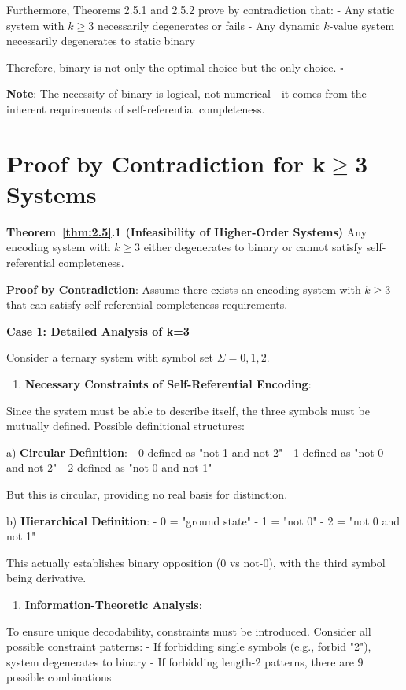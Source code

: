    Furthermore, Theorems 2.5.1 and 2.5.2 prove by contradiction that:
   - Any static system with $k \geq 3$ necessarily degenerates or fails
   - Any dynamic $k$-value system necessarily degenerates to static binary
   
Therefore, binary is not only the optimal choice but the only choice. $\square$

\textbf{Note}: The necessity of binary is logical, not numerical---it comes from the inherent requirements of self-referential completeness.

\section{Proof by Contradiction for k$\geq$3 Systems}
\label{sec:ch04_encoding:proof-by-contradiction-for-k-geq-3-systems}

\textbf{Theorem~\ref{thm:2.5}.1 (Infeasibility of Higher-Order Systems)}
\label{thm:2.5}
Any encoding system with $k \geq 3$ either degenerates to binary or cannot satisfy self-referential completeness.

\textbf{Proof by Contradiction}:
Assume there exists an encoding system with $k \geq 3$ that can satisfy self-referential completeness requirements.

\textbf{Case 1: Detailed Analysis of k=3}

Consider a ternary system with symbol set $\Sigma = {0, 1, 2}$.

\begin{enumerate}
\item \textbf{Necessary Constraints of Self-Referential Encoding}:
\end{enumerate}
   Since the system must be able to describe itself, the three symbols must be mutually defined. Possible definitional structures:
   
   a) \textbf{Circular Definition}:
   - 0 defined as "not 1 and not 2"
   - 1 defined as "not 0 and not 2"  
   - 2 defined as "not 0 and not 1"
   
   But this is circular, providing no real basis for distinction.

   b) \textbf{Hierarchical Definition}:
   - 0 = "ground state"
   - 1 = "not 0"
   - 2 = "not 0 and not 1"
   
   This actually establishes binary opposition (0 vs not-0), with the third symbol being derivative.

\begin{enumerate}
\item \textbf{Information-Theoretic Analysis}:
\end{enumerate}
   To ensure unique decodability, constraints must be introduced. Consider all possible constraint patterns:
   - If forbidding single symbols (e.g., forbid "2"), system degenerates to binary
   - If forbidding length-2 patterns, there are 9 possible combinations
   
